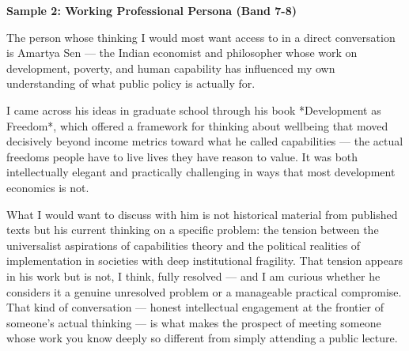 \begin{ieltsanswer}
\textbf{Sample 2: Working Professional Persona (Band 7-8)}

The person whose thinking I would most want access to in a direct conversation is Amartya Sen — the Indian economist and philosopher whose work on development, poverty, and human capability has influenced my own understanding of what public policy is actually for.

I came across his ideas in graduate school through his book *Development as Freedom*, which offered a framework for thinking about wellbeing that moved decisively beyond income metrics toward what he called capabilities — the actual freedoms people have to live lives they have reason to value. It was both intellectually elegant and practically challenging in ways that most development economics is not.

What I would want to discuss with him is not historical material from published texts but his current thinking on a specific problem: the tension between the universalist aspirations of capabilities theory and the political realities of implementation in societies with deep institutional fragility. That tension appears in his work but is not, I think, fully resolved — and I am curious whether he considers it a genuine unresolved problem or a manageable practical compromise. That kind of conversation — honest intellectual engagement at the frontier of someone's actual thinking — is what makes the prospect of meeting someone whose work you know deeply so different from simply attending a public lecture.
\end{ieltsanswer}


